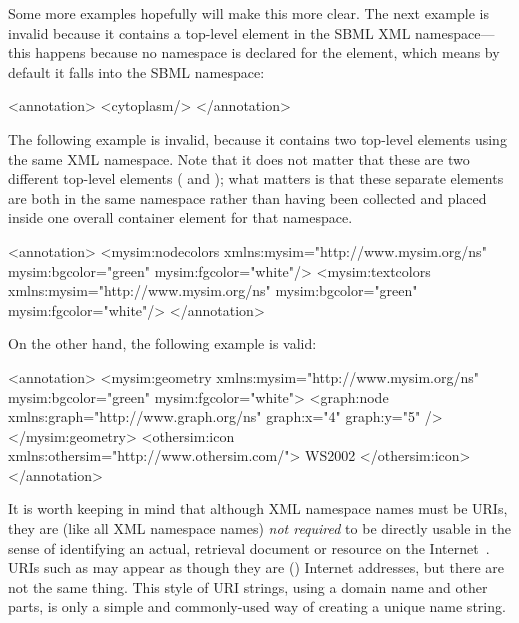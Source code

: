 Some more examples hopefully will make this more clear.  The next
example is invalid because it contains a top-level element in the
SBML XML namespace---this happens because no namespace is declared
for the  element, which means by default it
falls into the SBML namespace:

\begin{example}
<annotation>
    <cytoplasm/>
</annotation>
\end{example}

The following example is  invalid,  because it contains two top-level elements using the same
XML namespace.  Note that it does not matter that these are two
different top-level elements ( and
); what matters is that these separate
elements are both in the same namespace rather than having been
collected and placed inside one overall container element for that
namespace.

\begin{example}
<annotation>
    <mysim:nodecolors xmlns:mysim="http://www.mysim.org/ns"
        mysim:bgcolor="green"
        mysim:fgcolor="white"/>
    <mysim:textcolors xmlns:mysim="http://www.mysim.org/ns"
        mysim:bgcolor="green"
        mysim:fgcolor="white"/>
</annotation>
\end{example}

On the other hand, the following example is valid:

\begin{example}
<annotation>
    <mysim:geometry xmlns:mysim="http://www.mysim.org/ns"
         mysim:bgcolor="green" mysim:fgcolor="white">
        <graph:node xmlns:graph="http://www.graph.org/ns" graph:x="4" graph:y="5" />
    </mysim:geometry>
    <othersim:icon xmlns:othersim="http://www.othersim.com/">
        WS2002
    </othersim:icon>
</annotation>
\end{example}

It is worth keeping in mind that although XML namespace names must
be URIs, they are (like all XML namespace names) \emph{not
  required} to be directly usable in the sense of identifying an
actual, retrieval document or resource on the
Internet~\citep{bray:1999}.  URIs such as
 may appear as though they are (\eg)
Internet addresses, but there are not the same thing.  This style
of URI strings, using a domain name and other parts, is only a
simple and commonly-used way of creating a unique name string.

